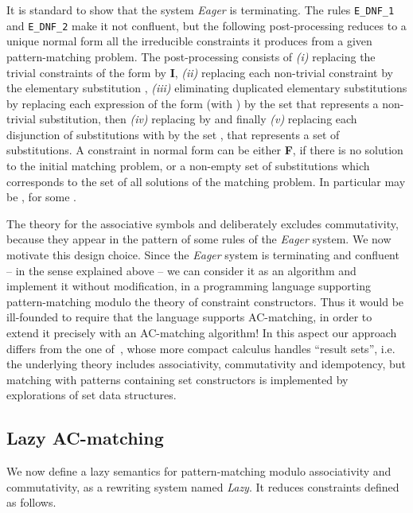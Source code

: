 \documentclass[submission,copyright,creativecommons]{eptcs}
\numberwithin{subcase}{case}
\begin{document}
It is standard to show that the system \textit{Eager} is terminating. The rules
\texttt{E\_DNF\_1} and \texttt{E\_DNF\_2} make it not confluent, but the
following post-processing reduces to a unique normal form all the irreducible
constraints it produces from a given pattern-matching problem. The
post-processing consists of \emph{(i)} replacing the trivial constraints of the
form  by \textbf{I}, \emph{(ii)} replacing each non-trivial
constraint  by the elementary substitution
 , \emph{(iii)} eliminating duplicated elementary substitutions by
 replacing each expression of the form  (with )
 by the set  that represents a
non-trivial substitution, then \emph{(iv)} replacing  by 
and finally \emph{(v)} replacing each disjunction  of
substitutions  with  by the set
, that represents a set of substitutions. A constraint in normal form can be either
\textbf{F}, if there is no solution to the initial matching problem, or a
non-empty set  of substitutions  which
corresponds to the set of all solutions of the matching problem. In particular
 may be , for some .


The theory for the associative symbols  and  deliberately excludes
commutativity, because they appear in the pattern of some rules of the
\textit{Eager} system. We now motivate  this design choice. 
Since the \textit{Eager} system  is terminating and confluent 
-- in the sense explained above -- we can consider
it  as an algorithm and implement it without
modification, in a programming language supporting pattern-matching modulo the
theory of constraint constructors. Thus it would be ill-founded to require that
the language supports AC-matching, in order to extend it precisely with an
AC-matching algorithm! In this aspect our approach differs from the one
of~\cite{rhoCalIGLP-I+II-2001}, whose more compact calculus handles ``result
sets'', i.e. the underlying theory includes associativity, commutativity and
idempotency, but matching with patterns
containing set constructors is implemented by explorations of set data
structures.
 

\subsection{Lazy AC-matching}
\label{ac:matching:sec}

We now define a lazy semantics for pattern-matching modulo associativity and
commutativity, as a rewriting system named \emph{Lazy}. It reduces constraints
defined as follows.
\end{document}
